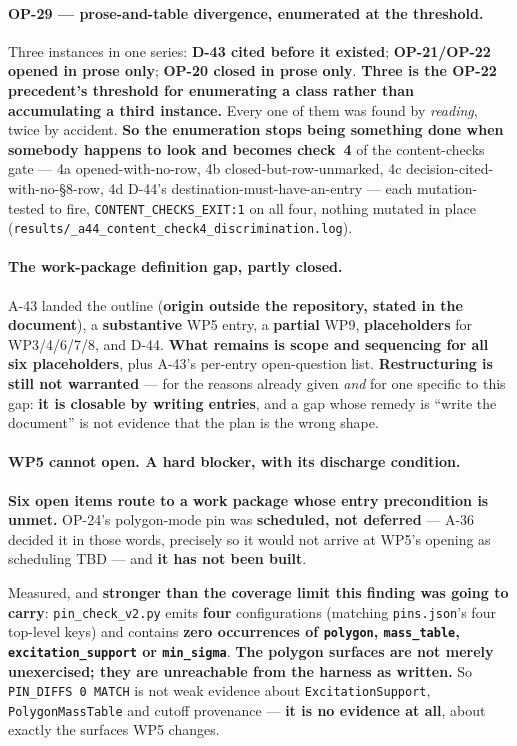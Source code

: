 \documentclass[
  10pt,
]{article}
\begin{document}
\paragraph{OP-29 --- prose-and-table divergence, enumerated at the threshold.}
Three instances in one series: \textbf{D-43 cited before it existed}; \textbf{OP-21/OP-22 opened in prose only}; \textbf{OP-20 closed in prose only}. \textbf{Three is the OP-22 precedent's threshold for enumerating a class rather than accumulating a third instance.} Every one of them was found by \emph{reading}, twice by accident. \textbf{So the enumeration stops being something done when somebody happens to look and becomes check~4} of the content-checks gate --- 4a opened-with-no-row, 4b closed-but-row-unmarked, 4c decision-cited-with-no-\S8-row, 4d D-44's destination-must-have-an-entry --- each mutation-tested to fire, \texttt{CONTENT\_CHECKS\_EXIT:1} on all four, nothing mutated in place (\texttt{results/\allowbreak{}\_a44\_content\_check4\_discrimination.log}).

\paragraph{The work-package definition gap, partly closed.}
A-43 landed the outline (\textbf{origin outside the repository, stated in the document}), a \textbf{substantive} WP5 entry, a \textbf{partial} WP9, \textbf{placeholders} for WP3/4/6/7/8, and D-44. \textbf{What remains is scope and sequencing for all six placeholders}, plus A-43's per-entry open-question list. \textbf{Restructuring is still not warranted} --- for the reasons already given \emph{and} for one specific to this gap: \textbf{it is closable by writing entries}, and a gap whose remedy is ``write the document'' is not evidence that the plan is the wrong shape.

\paragraph{WP5 cannot open. A hard blocker, with its discharge condition.}
\textbf{Six open items route to a work package whose entry precondition is unmet.} OP-24's polygon-mode pin was \textbf{scheduled, not deferred} --- A-36 decided it in those words, precisely so it would not arrive at WP5's opening as scheduling TBD --- and \textbf{it has not been built}.

Measured, and \textbf{stronger than the coverage limit this finding was going to carry}: \texttt{pin\_check\_v2.py} emits \textbf{four} configurations (matching \texttt{pins.json}'s four top-level keys) and contains \textbf{zero occurrences of \texttt{polygon}, \texttt{mass\_table}, \texttt{excitation\_support} or \texttt{min\_sigma}}. \textbf{The polygon surfaces are not merely unexercised; they are unreachable from the harness as written.} So \texttt{PIN\_DIFFS 0 MATCH} is not weak evidence about \texttt{ExcitationSupport}, \texttt{PolygonMassTable} and cutoff provenance --- \textbf{it is no evidence at all}, about exactly the surfaces WP5 changes.
\end{document}
